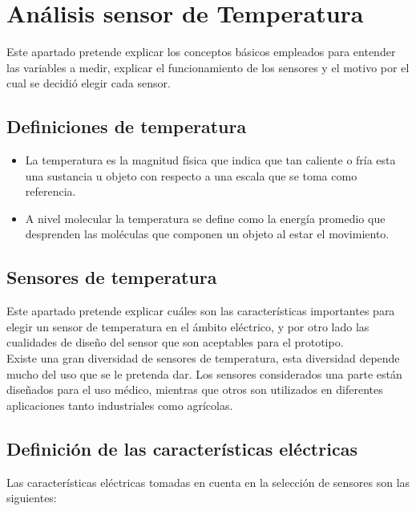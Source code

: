 \newpage\section{An{á}lisis sensor de Temperatura}

Este apartado pretende explicar los conceptos básicos empleados para entender las variables a medir, explicar el funcionamiento de los sensores y el motivo por el cual se decidió elegir cada sensor. \\

\subsection{Definiciones de temperatura}

\begin{itemize}
	\item La temperatura es la magnitud física que indica que tan caliente o fría esta una sustancia u objeto con respecto a una escala que se toma como referencia.
	\item A nivel molecular la temperatura se define como la energía promedio que desprenden las moléculas que componen un objeto al estar el movimiento.
\end{itemize}

\subsection{Sensores de temperatura}

Este apartado pretende explicar cuáles son las características importantes para elegir un sensor de temperatura en el ámbito eléctrico, y por otro lado las cualidades de diseño del sensor que son aceptables para el prototipo. \\

Existe una gran diversidad de sensores de temperatura, esta diversidad depende mucho del uso que se le pretenda dar. Los sensores considerados una parte están diseñados para el uso médico, mientras que otros son utilizados en diferentes aplicaciones tanto industriales como agrícolas.

\subsection{Definición de las características eléctricas}

Las características eléctricas tomadas en cuenta en la selección de sensores son las siguientes: \\


